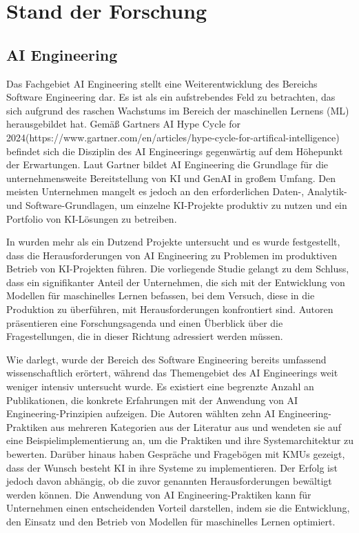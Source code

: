 \documentclass[11pt,a4paper,pointlessnumbers]{scrartcl}
\theoremstyle{break}
\numberwithin{equation}{section}
\begin{document}
\section{Stand der Forschung}
\subsection{AI Engineering}
Das Fachgebiet AI Engineering stellt eine Weiterentwicklung des Bereichs Software Engineering dar. Es ist als ein aufstrebendes Feld zu betrachten, das sich aufgrund des raschen Wachstums im Bereich der maschinellen Lernens (ML) herausgebildet hat. Gemäß Gartners \glqq AI Hype Cycle for 2024\grqq  (https://www.gartner.com/en/articles/hype-cycle-for-artifical-intelligence) befindet sich die Disziplin des AI Engineerings gegenwärtig auf dem Höhepunkt der Erwartungen. Laut Gartner bildet AI Engineering die Grundlage für die unternehmensweite Bereitstellung von KI und GenAI in großem Umfang. Den meisten Unternehmen mangelt es jedoch an den erforderlichen Daten-, Analytik- und Software-Grundlagen, um einzelne KI-Projekte produktiv zu nutzen und ein Portfolio von KI-Lösungen zu betreiben. 

In \cite{boschEngineeringAISystems2021} wurden mehr als ein Dutzend Projekte untersucht und es wurde festgestellt, dass die Herausforderungen von AI Engineering zu Problemen im produktiven Betrieb von KI-Projekten führen. Die vorliegende Studie gelangt zu dem Schluss, dass ein signifikanter Anteil der Unternehmen, die sich mit der Entwicklung von Modellen für maschinelles Lernen befassen, bei dem Versuch, diese in die Produktion zu überführen, mit Herausforderungen konfrontiert sind. Autoren präsentieren eine Forschungsagenda und einen Überblick über die Fragestellungen, die in dieser Richtung adressiert werden müssen. 

Wie \cite{groteCaseStudyAI2023} darlegt, wurde der Bereich des Software Engineering bereits umfassend wissenschaftlich erörtert, während das Themengebiet des AI Engineerings weit weniger intensiv untersucht wurde. Es existiert eine begrenzte Anzahl an Publikationen, die konkrete Erfahrungen mit der Anwendung von AI Engineering-Prinzipien aufzeigen. Die Autoren wählten zehn AI Engineering-Praktiken aus mehreren Kategorien aus der Literatur aus und wendeten sie auf eine Beispielimplementierung an, um die Praktiken und ihre Systemarchitektur zu bewerten. Darüber hinaus haben Gespräche und Fragebögen mit KMUs gezeigt, dass der Wunsch besteht KI in ihre Systeme zu implementieren. Der Erfolg ist jedoch davon abhängig, ob die zuvor genannten Herausforderungen bewältigt werden können. Die Anwendung von AI Engineering-Praktiken kann für Unternehmen einen entscheidenden Vorteil darstellen, indem sie die Entwicklung, den Einsatz und den Betrieb von Modellen für maschinelles Lernen optimiert.
\end{document}
